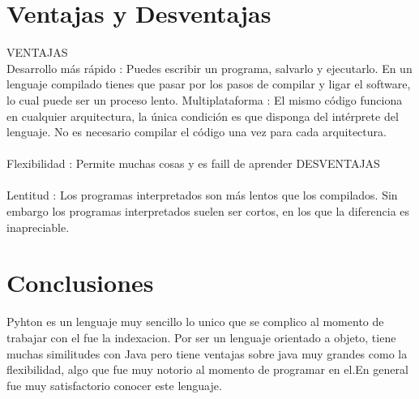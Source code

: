 \documentclass[11pt]{article} %
\begin{document}
\section{ Ventajas y Desventajas}
VENTAJAS\\
Desarrollo más rápido : Puedes escribir un programa, salvarlo y ejecutarlo. En un lenguaje compilado tienes que pasar por los pasos de compilar y ligar el software, lo cual puede ser un proceso lento.
Multiplataforma : El mismo código funciona en cualquier arquitectura, la única condición es que disponga del intérprete del lenguaje. No es necesario compilar el código una vez para cada arquitectura.\\\\
Flexibilidad : Permite muchas cosas y es faill de aprender
\newline
DESVENTAJAS\\\\
Lentitud : Los programas interpretados son más lentos que los compilados. Sin embargo los programas interpretados suelen ser cortos, en los que la diferencia es inapreciable.


\section{ Conclusiones}
Pyhton es un lenguaje muy sencillo lo unico que se complico al momento de trabajar con el fue la indexacion. Por ser un lenguaje
orientado a objeto, tiene muchas similitudes con Java pero tiene ventajas sobre java muy grandes como la flexibilidad, algo que fue muy notorio al momento de programar en el.En general fue muy satisfactorio conocer este lenguaje.
\end{document}
